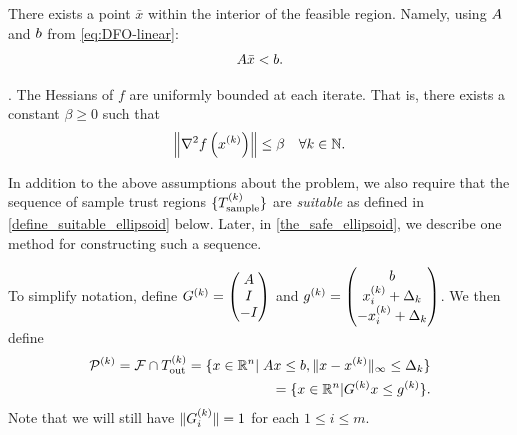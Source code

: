 \documentclass{article}
\begin{document}
\begin{assumption}
\label{interior_point}
There exists a point $\bar x$ within the interior of the feasible region.
Namely, using ${A}$ and ${b}$ from \cref{eq:DFO-linear}:
\begin{align}
{A} \bar x < {b}.
\end{align}
\end{assumption}


\begin{assumption}
\label{uniformly_bounded_hessians_of_f} .
The Hessians of $f$ are uniformly bounded at each iterate. That is, there exists a constant $\beta \ge 0$ such that
\begin{align*}
\left\|\nabla^2 f\left(x^{(k)}\right)\right\| \le \beta \quad \forall k \in \mathbb N.
\end{align*}
\end{assumption}

In addition to the above assumptions about the problem, we also require that the sequence of sample trust regions $\{{T_{\text{sample}}^{(k)}}\}$ are \emph{suitable} as defined in \cref{define_suitable_ellipsoid} below.   
  Later, in \cref{the_safe_ellipsoid}, we describe one method for constructing such a sequence.

To simplify notation, define $G^{(k)} = \begin{pmatrix} {A} \\ I \\ -I \end{pmatrix}$ and 
${g^{(k)}} = \begin{pmatrix} {b} \\ x_i^{(k)}+\Delta_k \\ -x_i^{(k)}+\Delta_k \end{pmatrix}$.
We then define
\begin{align}
{{\mathcal{P}}^{(k)}} = {\mathcal F} \cap {T_{\text{out}}^{(k)}} =  \{x \in \mathbb R^n | \; {A} x \le {b}, \|x - x^{(k)}\|_{\infty} \le \Delta_k \} \label{polyhedron_k}  \\
= \{x \in \mathbb R^n | G^{(k)} x \le {g^{(k)}} \}. \nonumber
\end{align}
Note that we will still have $\|G^{(k)}_i\| = 1$ for each $1 \le i \le m$.
\end{document}
